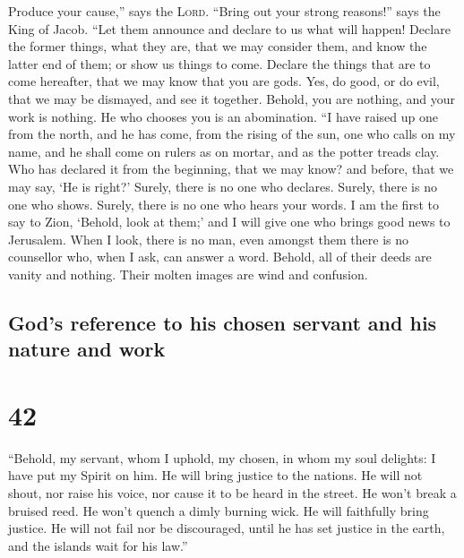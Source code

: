  Produce your cause,'' says the \textsc{Lord}. ``Bring
out your strong reasons!'' says the King of Jacob.  ``Let
them announce and declare to us what will happen! Declare the former
things, what they are, that we may consider them, and know the latter
end of them; or show us things to come.  Declare the
things that are to come hereafter, that we may know that you are gods.
Yes, do good, or do evil, that we may be dismayed, and see it together.
 Behold, you are nothing, and your work is nothing. He
who chooses you is an abomination.  ``I have raised up
one from the north, and he has come, from the rising of the sun, one who
calls on my name, and he shall come on rulers as on mortar, and as the
potter treads clay.  Who has declared it from the
beginning, that we may know? and before, that we may say, `He is right?'
Surely, there is no one who declares. Surely, there is no one who shows.
Surely, there is no one who hears your words.  I am the
first to say to Zion, `Behold, look at them;' and I will give one who
brings good news to Jerusalem.  When I look, there is no
man, even amongst them there is no counsellor who, when I ask, can
answer a word.  Behold, all of their deeds are vanity and
nothing. Their molten images are wind and confusion.

\hypertarget{gods-reference-to-his-chosen-servant-and-his-nature-and-work}{%
\subsection{God's reference to his chosen servant and his nature and
work}\label{gods-reference-to-his-chosen-servant-and-his-nature-and-work}}

\hypertarget{section-41}{%
\section{42}\label{section-41}}

 ``Behold, my servant, whom I uphold, my chosen, in whom
my soul delights: I have put my Spirit on him. He will bring justice to
the nations.  He will not shout, nor raise his voice, nor
cause it to be heard in the street.  He won't break a
bruised reed. He won't quench a dimly burning wick. He will faithfully
bring justice.  He will not fail nor be discouraged, until
he has set justice in the earth, and the islands wait for his law.''

